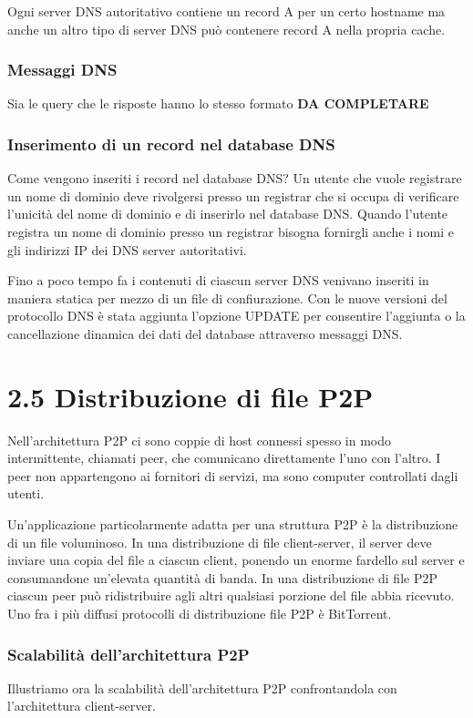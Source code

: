\documentclass{book}
\begin{document}
Ogni server DNS autoritativo contiene un record A per un certo hostname ma anche un altro tipo di server DNS può contenere record A nella propria cache.

\subsubsection*{Messaggi DNS}
Sia le query che le risposte hanno lo stesso formato
\textbf{DA COMPLETARE}

\subsubsection*{Inserimento di un record nel database DNS}
Come vengono inseriti i record nel database DNS? Un utente che vuole registrare un nome di dominio deve rivolgersi presso un registrar che si occupa di verificare l'unicità del nome di dominio e di inserirlo nel database DNS. Quando l'utente registra un nome di dominio presso un registrar bisogna fornirgli anche i nomi e gli indirizzi IP dei DNS server autoritativi.

Fino a poco tempo fa i contenuti di ciascun server DNS venivano inseriti in maniera statica per mezzo di un file di confiurazione. Con le nuove versioni del protocollo DNS è stata aggiunta l'opzione UPDATE per consentire l'aggiunta o la cancellazione dinamica dei dati del database attraverso messaggi DNS.

\section*{2.5 Distribuzione di file P2P}
Nell'architettura P2P ci sono coppie di host connessi spesso in modo intermittente, chiamati peer, che comunicano direttamente l'uno con l'altro. I peer non appartengono ai fornitori di servizi, ma sono computer controllati dagli utenti.

Un'applicazione particolarmente adatta per una struttura P2P è la distribuzione di un file voluminoso. In una distribuzione di file client-server, il server deve inviare una copia del file a ciascun client, ponendo un enorme fardello sul server e consumandone un'elevata quantità di banda. In una distribuzione di file P2P ciascun peer può ridistribuire agli altri qualsiasi porzione del file abbia ricevuto. Uno fra i più diffusi protocolli di distribuzione file P2P è BitTorrent.

\subsubsection*{Scalabilità dell'architettura P2P}
Illustriamo ora la scalabilità dell'architettura P2P confrontandola con l'architettura client-server.
\end{document}
